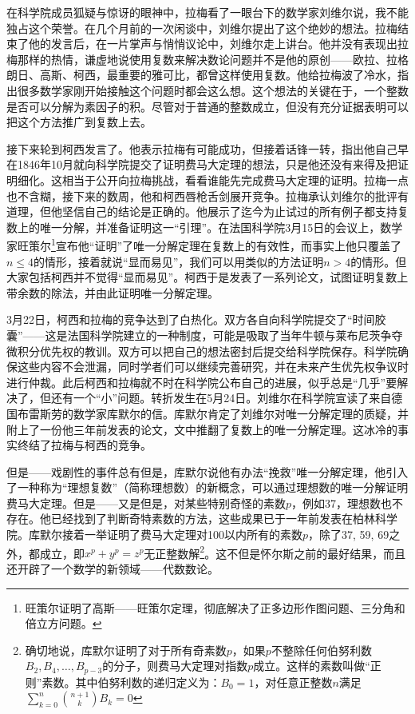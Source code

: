 \documentclass[b5paper]{ctexart}
\begin{document}
在科学院成员狐疑与惊讶的眼神中，拉梅看了一眼台下的数学家刘维尔说，我不能独占这个荣誉。在几个月前的一次闲谈中，刘维尔提出了这个绝妙的想法。拉梅结束了他的发言后，在一片掌声与悄悄议论中，刘维尔走上讲台。他并没有表现出拉梅那样的热情，谦虚地说使用复数来解决数论问题并不是他的原创——欧拉、拉格朗日、高斯、柯西，最重要的雅可比，都曾这样使用复数。他给拉梅波了冷水，指出很多数学家刚开始接触这个问题时都会这么想。这个想法的关键在于，一个整数是否可以分解为素因子的积。尽管对于普通的整数成立，但没有充分证据表明可以把这个方法推广到复数上去。

接下来轮到柯西发言了。他表示拉梅有可能成功，但接着话锋一转，指出他自己早在1846年10月就向科学院提交了证明费马大定理的想法，只是他还没有来得及把证明细化。这相当于公开向拉梅挑战，看看谁能先完成费马大定理的证明。拉梅一点也不含糊，接下来的数周，他和柯西唇枪舌剑展开竞争。拉梅承认刘维尔的批评有道理，但他坚信自己的结论是正确的。他展示了迄今为止试过的所有例子都支持复数上的唯一分解，并准备证明这一“引理”。在法国科学院3月15日的会议上，数学家旺策尔\footnote{旺策尔证明了高斯——旺策尔定理，彻底解决了正多边形作图问题、三分角和倍立方问题。}宣布他“证明”了唯一分解定理在复数上的有效性，而事实上他只覆盖了$n \leq 4$的情形，接着就说“显而易见”，我们可以用类似的方法证明$n > 4$的情形。但大家包括柯西并不觉得“显而易见”。柯西于是发表了一系列论文，试图证明复数上带余数的除法，并由此证明唯一分解定理。

3月22日，柯西和拉梅的竞争达到了白热化。双方各自向科学院提交了“时间胶囊”——这是法国科学院建立的一种制度，可能是吸取了当年牛顿与莱布尼茨争夺微积分优先权的教训。双方可以把自己的想法密封后提交给科学院保存。科学院确保这些内容不会泄漏，同时学者们可以继续完善研究，并在未来产生优先权争议时进行仲裁。此后柯西和拉梅就不时在科学院公布自己的进展，似乎总是“几乎”要解决了，但还有一个“小”问题。转折发生在5月24日。刘维尔在科学院宣读了来自德国布雷斯劳的数学家库默尔的信。库默尔肯定了刘维尔对唯一分解定理的质疑，并附上了一份他三年前发表的论文，文中推翻了复数上的唯一分解定理。这冰冷的事实终结了拉梅与柯西的竞争。

但是——戏剧性的事件总有但是，库默尔说他有办法“挽救”唯一分解定理，他引入了一种称为“理想复数”（简称理想数）的新概念，可以通过理想数的唯一分解证明费马大定理。但是——又是但是，对某些特别奇怪的素数$p$，例如37，理想数也不存在。他已经找到了判断奇特素数的方法，这些成果已于一年前发表在柏林科学院。库默尔接着一举证明了费马大定理对100以内所有的素数$p$，除了37, 59, 69之外，都成立，即$x^p + y^p = z^p$无正整数解\footnote{确切地说，库默尔证明了对于所有奇素数$p$，如果$p$不整除任何伯努利数$B_2, B_4, \dotsc, B_{p-3}$的分子，则费马大定理对指数$p$成立。这样的素数叫做“正则”素数。其中伯努利数的递归定义为：$B_0 = 1$，对任意正整数$n$满足$\displaystyle \sum_{k = 0}^{n}\binom{n + 1}{k} B_k = 0$}。这不但是怀尔斯之前的最好结果，而且还开辟了一个数学的新领域——代数数论。
\end{document}
